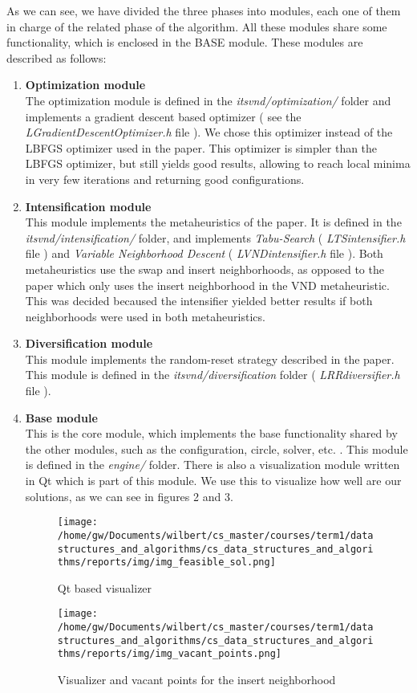 \documentclass{article}
\begin{document}
As we can see, we have divided the three phases into modules, each one of them in charge of the related phase of the algorithm. All these modules share some functionality, which is enclosed in the BASE module. These modules are described as follows:

\begin{enumerate}
\item \textbf{Optimization module} \\
The optimization module is defined in the \textit{itsvnd/optimization/} folder and implements a gradient descent based optimizer ( see the \textit{LGradientDescentOptimizer.h} file ). We chose this optimizer instead of the LBFGS optimizer used in the paper. This optimizer is simpler than the LBFGS optimizer, but still yields good results, allowing to reach local minima in very few iterations and returning good configurations.
\item \textbf{Intensification module} \\
This module implements the metaheuristics of the paper. It is defined in the \textit{itsvnd/intensification/} folder, and implements \textit{Tabu-Search} ( \textit{LTSintensifier.h} file ) and \textit{Variable Neighborhood Descent} ( \textit{LVNDintensifier.h} file ). Both metaheuristics use the swap and insert neighborhoods, as opposed to the paper which only uses the insert neighborhood in the VND metaheuristic. This was decided becaused the intensifier yielded better results if both neighborhoods were used in both metaheuristics.
\item \textbf{Diversification module} \\
This module implements the random-reset strategy described in the paper. This module is defined in the \textit{itsvnd/diversification} folder ( \textit{LRRdiversifier.h} file ).
\item \textbf{Base module} \\
This is the core module, which implements the base functionality shared by the other modules, such as the configuration, circle, solver, etc. . This module is defined in the \textit{engine/} folder. There is also a visualization module written in Qt which is part of this module. We use this to visualize how well are our solutions, as we can see in figures 2 and 3.

\begin{figure}[H]
	\centering
	\texttt{[image: /home/gw/Documents/wilbert/cs\_master/courses/term1/datastructures\_and\_algorithms/cs\_data\_structures\_and\_algorithms/reports/img/img\_feasible\_sol.png]}
	\caption{Qt based visualizer}
	\label{fig:img_pecc}
\end{figure}

\begin{figure}[H]
	\centering
	\texttt{[image: /home/gw/Documents/wilbert/cs\_master/courses/term1/datastructures\_and\_algorithms/cs\_data\_structures\_and\_algorithms/reports/img/img\_vacant\_points.png]}
	\caption{Visualizer and vacant points for the insert neighborhood}
	\label{fig:img_pecc}
\end{figure}

\end{enumerate}
\end{document}
